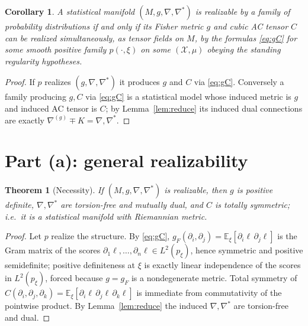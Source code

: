 \documentclass{amsart}
\newtheorem{theorem}{Theorem}
\newtheorem{corollary}{Corollary}
\theoremstyle{definition}
\theoremstyle{remark}
\begin{document}
\begin{corollary}\label{cor:reduce}
A statistical manifold $(M,g,\nabla,\nabla^{*})$ is realizable by a family of
probability distributions if and only if its Fisher metric $g$ and cubic AC
tensor $C$ can be realized simultaneously, as tensor fields on $M$, by the
formulas \eqref{eq:gC} for some smooth positive family $p(\cdot,\xi)$ on some
$(\mathcal X,\mu)$ obeying the standing regularity hypotheses.
\end{corollary}

\begin{proof}
If $p$ realizes $(g,\nabla,\nabla^{*})$ it produces $g$ and $C$ via
\eqref{eq:gC}. Conversely a family producing $g,C$ via \eqref{eq:gC} is a
statistical model whose induced metric is $g$ and induced AC tensor is $C$; by
Lemma~\ref{lem:reduce} its induced dual connections are exactly
$\nabla^{(g)}\mp K=\nabla,\nabla^{*}$.
\end{proof}

\section{Part (a): general realizability}

\begin{theorem}[Necessity]\label{thm:nec}
If $(M,g,\nabla,\nabla^{*})$ is realizable, then $g$ is positive definite,
$\nabla,\nabla^{*}$ are torsion-free and mutually dual, and $C$ is totally
symmetric; i.e.\ it is a statistical manifold with Riemannian metric.
\end{theorem}

\begin{proof}
Let $p$ realize the structure. By \eqref{eq:gC},
$g_{F}(\partial_{i},\partial_{j})=\mathbb E_{\xi}[\partial_{i}\ell\,
\partial_{j}\ell]$ is the Gram matrix of the scores
$\partial_{1}\ell,\dots,\partial_{n}\ell\in L^{2}(p_{\xi})$, hence symmetric and
positive semidefinite; positive definiteness at $\xi$ is exactly linear
independence of the scores in $L^{2}(p_{\xi})$, forced because $g=g_{F}$ is a
nondegenerate metric. Total symmetry of
$C(\partial_{i},\partial_{j},\partial_{k})=\mathbb E_{\xi}[\partial_{i}\ell\,
\partial_{j}\ell\,\partial_{k}\ell]$ is immediate from commutativity of the
pointwise product. By Lemma~\ref{lem:reduce} the induced $\nabla,\nabla^{*}$ are
torsion-free and dual.
\end{proof}
\end{document}
